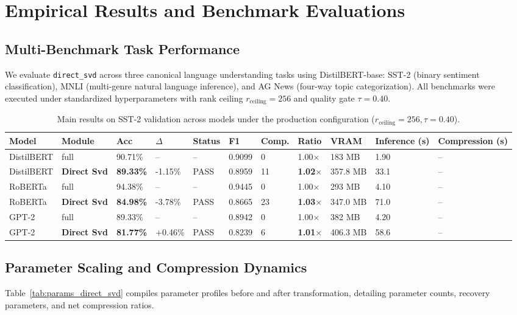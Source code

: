 \section{Empirical Results and Benchmark Evaluations}
\label{sec:results}

\subsection{Multi-Benchmark Task Performance}
We evaluate \texttt{direct\_svd} across three canonical language understanding tasks using DistilBERT-base: SST-2 (binary sentiment classification), MNLI (multi-genre natural language inference), and AG News (four-way topic categorization). All benchmarks were executed under standardized hyperparameters with rank ceiling $r_{\mathrm{ceiling}} = 256$ and quality gate $\tau = 0.40$.

\begin{table}[t]
\centering
\small
\begin{tabular}{lllllllllll}
\toprule
\textbf{Model} & \textbf{Module} & \textbf{Acc} & \textbf{$\Delta$} & \textbf{Status} & \textbf{F1} & \textbf{Comp.} & \textbf{Ratio} & \textbf{VRAM} & \textbf{Inference (s)} & \textbf{Compression (s)} \\
\midrule
DistilBERT & full & 90.71\% & -- & -- & 0.9099 & 0 & 1.00$\times$ & 183 MB & 1.90 & -- \\
DistilBERT & \textbf{Direct Svd} & \textbf{89.33\%} & -1.15\% & PASS & 0.8959 & 11 & \textbf{1.02$\times$} & 357.8 MB & 33.1 & -- \\
RoBERTa & full & 94.38\% & -- & -- & 0.9445 & 0 & 1.00$\times$ & 293 MB & 4.10 & -- \\
RoBERTa & \textbf{Direct Svd} & \textbf{84.98\%} & -3.78\% & PASS & 0.8665 & 23 & \textbf{1.03$\times$} & 347.0 MB & 71.0 & -- \\
GPT-2 & full & 89.33\% & -- & -- & 0.8942 & 0 & 1.00$\times$ & 382 MB & 4.20 & -- \\
GPT-2 & \textbf{Direct Svd} & \textbf{81.77\%} & +0.46\% & PASS & 0.8239 & 6 & \textbf{1.01$\times$} & 406.3 MB & 58.6 & -- \\
\bottomrule
\end{tabular}
\caption{Main results on SST-2 validation across models under the production configuration ($r_{\mathrm{ceiling}}=256, \tau=0.40$).}
\label{tab:main_sst2}
\end{table}

\subsection{Parameter Scaling and Compression Dynamics}
Table~\ref{tab:params_direct_svd} compiles parameter profiles before and after transformation, detailing parameter counts, recovery parameters, and net compression ratios.

